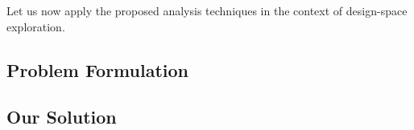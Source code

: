 Let us now apply the proposed analysis techniques in the context of design-space exploration.

\subsection{Problem Formulation}


\subsection{Our Solution}


